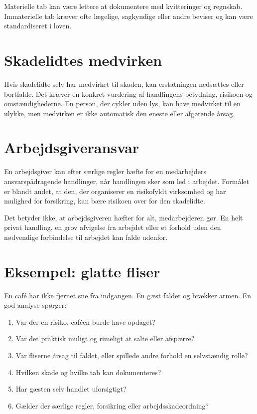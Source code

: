 Materielle tab kan være lettere at dokumentere med kvitteringer og regnskab. Immaterielle tab kræver ofte lægelige, sagkyndige eller andre beviser og kan være standardiseret i loven.

\section{Skadelidtes medvirken}

Hvis skadelidte selv har medvirket til skaden, kan erstatningen nedsættes eller bortfalde. Det kræver en konkret vurdering af handlingens betydning, risikoen og omstændighederne. En person, der cykler uden lys, kan have medvirket til en ulykke, men medvirken er ikke automatisk den eneste eller afgørende årsag.

\section{Arbejdsgiveransvar}

En arbejdsgiver kan efter særlige regler hæfte for en medarbejders ansvarspådragende handlinger, når handlingen sker som led i arbejdet. Formålet er blandt andet, at den, der organiserer en risikofyldt virksomhed og har mulighed for forsikring, kan bære risikoen over for den skadelidte.

Det betyder ikke, at arbejdsgiveren hæfter for alt, medarbejderen gør. En helt privat handling, en grov afvigelse fra arbejdet eller et forhold uden den nødvendige forbindelse til arbejdet kan falde udenfor.

\section{Eksempel: glatte fliser}

En café har ikke fjernet sne fra indgangen. En gæst falder og brækker armen. En god analyse spørger:
\begin{enumerate}
  \item Var der en risiko, caféen burde have opdaget?
  \item Var det praktisk muligt og rimeligt at salte eller afspærre?
  \item Var fliserne årsag til faldet, eller spillede andre forhold en selvstændig rolle?
  \item Hvilken skade og hvilke tab kan dokumenteres?
  \item Har gæsten selv handlet uforsigtigt?
  \item Gælder der særlige regler, forsikring eller arbejdsskadeordning?
\end{enumerate}

